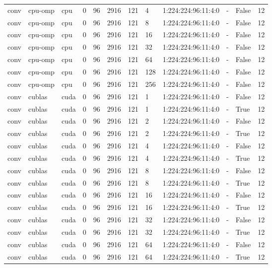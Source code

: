 \begin{tabular}{llllllllllll}
conv & cpu-omp & cpu & 0 & 96 & 2916 & 121 & 4 & 1:224:224:96:11:4:0 & - & False & 12 \\
conv & cpu-omp & cpu & 0 & 96 & 2916 & 121 & 8 & 1:224:224:96:11:4:0 & - & False & 12 \\
conv & cpu-omp & cpu & 0 & 96 & 2916 & 121 & 16 & 1:224:224:96:11:4:0 & - & False & 12 \\
conv & cpu-omp & cpu & 0 & 96 & 2916 & 121 & 32 & 1:224:224:96:11:4:0 & - & False & 12 \\
conv & cpu-omp & cpu & 0 & 96 & 2916 & 121 & 64 & 1:224:224:96:11:4:0 & - & False & 12 \\
conv & cpu-omp & cpu & 0 & 96 & 2916 & 121 & 128 & 1:224:224:96:11:4:0 & - & False & 12 \\
conv & cpu-omp & cpu & 0 & 96 & 2916 & 121 & 256 & 1:224:224:96:11:4:0 & - & False & 12 \\
conv & cublas & cuda & 0 & 96 & 2916 & 121 & 1 & 1:224:224:96:11:4:0 & - & False & 12 \\
conv & cublas & cuda & 0 & 96 & 2916 & 121 & 1 & 1:224:224:96:11:4:0 & - & True & 12 \\
conv & cublas & cuda & 0 & 96 & 2916 & 121 & 2 & 1:224:224:96:11:4:0 & - & False & 12 \\
conv & cublas & cuda & 0 & 96 & 2916 & 121 & 2 & 1:224:224:96:11:4:0 & - & True & 12 \\
conv & cublas & cuda & 0 & 96 & 2916 & 121 & 4 & 1:224:224:96:11:4:0 & - & False & 12 \\
conv & cublas & cuda & 0 & 96 & 2916 & 121 & 4 & 1:224:224:96:11:4:0 & - & True & 12 \\
conv & cublas & cuda & 0 & 96 & 2916 & 121 & 8 & 1:224:224:96:11:4:0 & - & False & 12 \\
conv & cublas & cuda & 0 & 96 & 2916 & 121 & 8 & 1:224:224:96:11:4:0 & - & True & 12 \\
conv & cublas & cuda & 0 & 96 & 2916 & 121 & 16 & 1:224:224:96:11:4:0 & - & False & 12 \\
conv & cublas & cuda & 0 & 96 & 2916 & 121 & 16 & 1:224:224:96:11:4:0 & - & True & 12 \\
conv & cublas & cuda & 0 & 96 & 2916 & 121 & 32 & 1:224:224:96:11:4:0 & - & False & 12 \\
conv & cublas & cuda & 0 & 96 & 2916 & 121 & 32 & 1:224:224:96:11:4:0 & - & True & 12 \\
conv & cublas & cuda & 0 & 96 & 2916 & 121 & 64 & 1:224:224:96:11:4:0 & - & False & 12 \\
conv & cublas & cuda & 0 & 96 & 2916 & 121 & 64 & 1:224:224:96:11:4:0 & - & True & 12 \\

\end{tabular}
